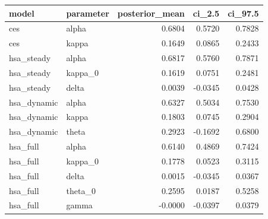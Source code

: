 \begin{tabular}{llrrr}
\toprule
model & parameter & posterior\_mean & ci\_2.5 & ci\_97.5 \\
\midrule
ces & alpha & 0.6804 & 0.5720 & 0.7828 \\
ces & kappa & 0.1649 & 0.0865 & 0.2433 \\
hsa\_steady & alpha & 0.6817 & 0.5760 & 0.7871 \\
hsa\_steady & kappa\_0 & 0.1619 & 0.0751 & 0.2481 \\
hsa\_steady & delta & 0.0039 & -0.0345 & 0.0428 \\
hsa\_dynamic & alpha & 0.6327 & 0.5034 & 0.7530 \\
hsa\_dynamic & kappa & 0.1803 & 0.0745 & 0.2904 \\
hsa\_dynamic & theta & 0.2923 & -0.1692 & 0.6800 \\
hsa\_full & alpha & 0.6140 & 0.4869 & 0.7424 \\
hsa\_full & kappa\_0 & 0.1778 & 0.0523 & 0.3115 \\
hsa\_full & delta & 0.0015 & -0.0345 & 0.0367 \\
hsa\_full & theta\_0 & 0.2595 & 0.0187 & 0.5258 \\
hsa\_full & gamma & -0.0000 & -0.0397 & 0.0379 \\
\bottomrule
\end{tabular}
